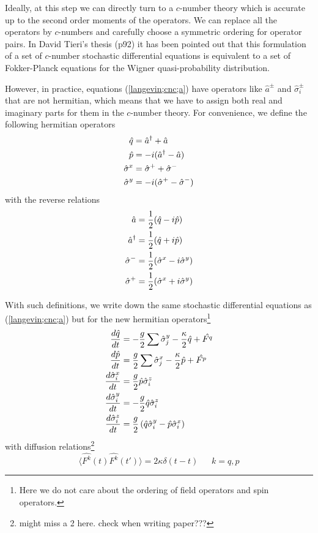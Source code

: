\documentclass{article}
\begin{document}
Ideally, at this step we can directly turn to a $c$-number theory which is accurate up to the second order moments of the operators. We can replace all the operators by $c$-numbers and carefully choose a symmetric ordering for operator pairs. In David Tieri's thesis (p92) it has been pointed out that this formulation of a set of $c$-number stochastic differential equations is equivalent to a set of Fokker-Planck equations for the Wigner quasi-probability distribution.

However, in practice, equations (\ref{langevin;cnc;a}) have operators like $\hat{a}^{\pm}$ and $\hat{\sigma}_i^\pm$ that are not hermitian, which means that we have to assign both real and imaginary parts for them in the $c$-number theory. For convenience, we define the following hermitian operators
\begin{align}
    \label{atoq}
    \notag \hat{q} &= \hat{a}^\dagger+\hat{a}\\
    \notag \hat{p} &= -i(\hat{a}^\dagger-\hat{a})\\
           \hat{\sigma}^x &= \hat{\sigma}^++\hat{\sigma}^-\\
    \notag \hat{\sigma}^y &= -i(\hat{\sigma}^+-\hat{\sigma}^-)
\end{align}
with the reverse relations
\begin{align}
    \label{qtoa}
    \notag \hat{a} &= \frac{1}{2}(\hat{q}-i\hat{p})\\
    \notag \hat{a}^\dagger &= \frac{1}{2}(\hat{q}+i\hat{p})\\
           \hat{\sigma}^- &= \frac{1}{2}(\hat{\sigma}^x-i\hat{\sigma}^y)\\
    \notag \hat{\sigma}^+ &= \frac{1}{2}(\hat{\sigma}^x+i\hat{\sigma}^y)
\end{align}

With such definitions, we write down the same stochastic differential equations as (\ref{langevin;cnc;a}) but for the new hermitian operators\footnote{Here we do not care about the ordering of field operators and spin operators.}
\begin{align}
    \notag \frac{d \hat{q}}{dt} &= -\frac{g}{2}\sum\hat{\sigma}_j^y-\frac{\kappa}{2}\hat{q}+\hat{F^q}\\
    \notag \frac{d \hat{p}}{dt} &= \frac{g}{2}\sum\hat{\sigma}_j^x-\frac{\kappa}{2}\hat{p}+\hat{F^p}\\
    \label{langevin;cnc;q}
    \frac{d \hat{\sigma}_i^x}{dt} &= \frac{g}{2}\hat{p}\hat{\sigma}^z_i\\
    \notag \frac{d \hat{\sigma}_i^y}{dt} &= -\frac{g}{2}\hat{q}\hat{\sigma}^z_i\\
    \notag \frac{d \hat{\sigma}_i^z}{dt} &= \frac{g}{2}\left(\hat{q}\hat{\sigma}^y_i-\hat{p}\hat{\sigma}_i^x\right)
\end{align}
with diffusion relations\footnote{might miss a 2 here. check when writing paper???}
\begin{equation}
\label{diffusion;cnc;q}
    \langle \hat{F^k}(t) \hat{F^k}(t')\rangle = 2\kappa \delta (t-t)\ \ \ \ \ \ \  k=q,p
\end{equation}
\end{document}
